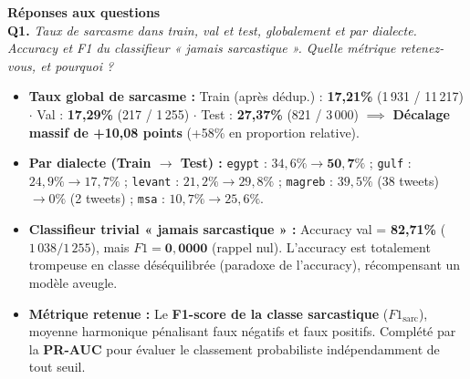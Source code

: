 \documentclass[10pt,a4paper]{article}
\newcommand{\questiontitle}[2]{%
  \noindent\textbf{#1.} \textit{#2}\par\vspace{1.5pt}%
}
\begin{document}
\vspace{-2pt}
\noindent\textbf{\large Réponses aux questions}\\[2pt]

\questiontitle{Q1}{Taux de sarcasme dans train, val et test, globalement et par dialecte. Accuracy et F1 du classifieur « jamais sarcastique ». Quelle métrique retenez-vous, et pourquoi ?}
\begin{tcolorbox}[reponsebox]
  \begin{itemize}
    \item \textbf{Taux global de sarcasme :} Train (après dédup.) : \textbf{17,21\%} (1\,931 / 11\,217) $\cdot$ Val : \textbf{17,29\%} (217 / 1\,255) $\cdot$ Test : \textbf{27,37\%} (821 / 3\,000) $\implies$ \textbf{Décalage massif de +10,08 points} (+58\% en proportion relative).
    \item \textbf{Par dialecte (Train $\rightarrow$ Test) :} \texttt{egypt} : $34{,}6\% \rightarrow \mathbf{50{,}7\%}$ ; \texttt{gulf} : $24{,}9\% \rightarrow 17{,}7\%$ ; \texttt{levant} : $21{,}2\% \rightarrow 29{,}8\%$ ; \texttt{magreb} : $39{,}5\%$ (38 tweets) $\rightarrow 0\%$ (2 tweets) ; \texttt{msa} : $10{,}7\% \rightarrow 25{,}6\%$.
    \item \textbf{Classifieur trivial « jamais sarcastique » :} Accuracy val = \textbf{82,71\%} ($1\,038 / 1\,255$), mais $F1 = \mathbf{0{,}0000}$ (rappel nul). L'accuracy est totalement trompeuse en classe déséquilibrée (paradoxe de l'accuracy), récompensant un modèle aveugle.
    \item \textbf{Métrique retenue :} Le \textbf{F1-score de la classe sarcastique} ($F1_{\text{sarc}}$), moyenne harmonique pénalisant faux négatifs et faux positifs. Complété par la \textbf{PR-AUC} pour évaluer le classement probabiliste indépendamment de tout seuil.
  \end{itemize}
\end{tcolorbox}
\end{document}
